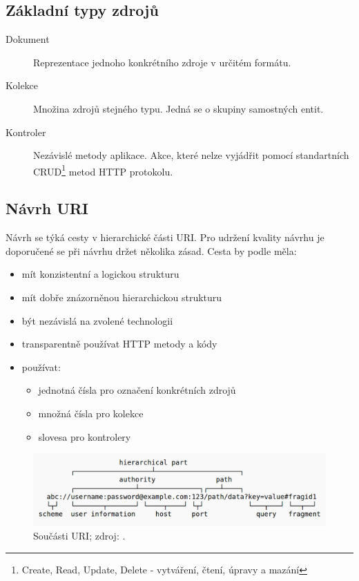 \subsection{Základní typy zdrojů \cite{rest_vse}}

\begin{description}
  \item[Dokument] Reprezentace jednoho konkrétního zdroje v určitém formátu.
  \item[Kolekce] Množina zdrojů stejného typu. Jedná se o skupiny samostných entit.
  \item[Kontroler] Nezávislé metody aplikace. Akce, které nelze vyjádřit pomocí standartních
  CRUD\footnote{Create, Read, Update, Delete - vytváření, čtení, úpravy a mazání} metod HTTP protokolu.
\end{description}

\subsection{Návrh URI}

Návrh se týká cesty v hierarchické části URI. Pro udržení kvality návrhu je doporučené se při návrhu  držet několika zásad. Cesta by podle \cite{rest_vse} měla:
    
\begin{itemize}
\item mít konzistentní a logickou strukturu
\item mít dobře znázorněnou hierarchickou strukturu
\item být nezávislá na zvolené technologii
\item transparentně používat HTTP metody a kódy
\item používat:
\begin{itemize}
\item jednotná čísla pro označení konkrétních zdrojů
\item množná čísla pro kolekce
\item slovesa pro kontrolery
\end{itemize}
\end{itemize}

\begin{figure}[ht!]
  \centering
  \includegraphics[width=130mm]{./images/uri.png}
  \caption{Součásti URI; zdroj: \cite{uri_wiki}.\label{overflow}}
  \label{fig:state_match}
\end{figure}

